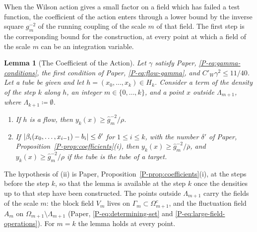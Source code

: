 \documentclass[11pt]{preprint}
\DeclarePairedDelimiter{\abs}{\lvert}{\rvert}
\numberwithin{equation}{section}
\newtheorem{lemma}{Lemma}[section]
\theoremstyle{definition}
\theoremstyle{remark}
\theoremstyle{plain}
\begin{document}
When the Wilson action gives a small factor on a field which has failed a test function, the coefficient of the action enters through a lower bound by the inverse square $g_m^{-2}$ of the running coupling of the scale $m$ of that field. The first step is the corresponding bound for the construction, at every point at which a field of the scale $m$ can be an integration variable.

\begin{lemma}[The Coefficient of the Action]\label{lem:action-coefficient}
Let $\gamma$ satisfy Paper, \eqref{P-eq:gamma-conditions}, the first condition of Paper, \eqref{P-eq:flow-gamma}, and $C'_W\gamma^2 \leq 11/40$. Let a tube be given and let $h = (x_0, \dots, x_k) \in H_k$. Consider a term of the density of the step $k$ along $h$, an integer $m \in \{ 0, \dots, k \}$, and a point $x$ outside $\Lambda_{m+1}$, where $\Lambda_{k+1} \coloneqq \emptyset$.
\begin{enumerate}[label=(\roman*)]
\item If $h$ is a flow, then $y_k(x) \geq \hat g_m^{-2}/\rho$.
\item If $\abs{\beta_i(x_0, \dots, x_{i-1}) - b_i} \leq \delta'$ for $1 \leq i \leq k$, with the number $\delta'$ of Paper, Proposition~\ref{P-prop:coefficients}(i), then $y_k(x) \geq \hat g_m^{-2}/\bar\rho$, and $y_k(x) \geq \hat g_m^{-2}/\rho$ if the tube is the tube of a target.
\end{enumerate}
\end{lemma}

The hypothesis of (ii) is Paper, Proposition~\ref{P-prop:coefficients}(i), at the steps before the step $k$, so that the lemma is available at the step $k$ once the densities up to that step have been constructed. The points outside $\Lambda_{m+1}$ carry the fields of the scale $m$: the block field $V_m$ lives on $\Gamma_m \subset \Omega_{m+1}^c$, and the fluctuation field $A_m$ on $\Omega_{m+1} \setminus \Lambda_{m+1}$ (Paper, \eqref{P-eq:determining-set} and \eqref{P-eq:large-field-operations}). For $m = k$ the lemma holds at every point.
\end{document}
